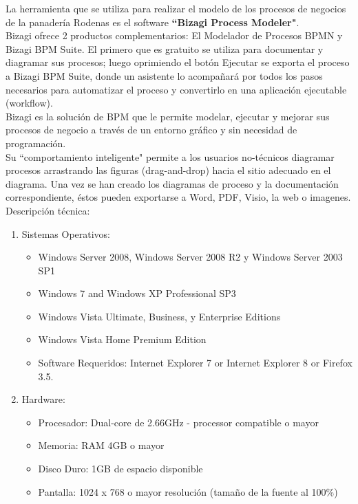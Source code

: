 La herramienta que se utiliza para realizar el modelo de los procesos de negocios de la panadería Rodenas es el software \textbf{``Bizagi Process Modeler"}.
\\

Bizagi ofrece 2 productos complementarios: El Modelador de Procesos BPMN y Bizagi BPM Suite. El primero que es gratuito se utiliza para documentar y diagramar sus procesos; luego oprimiendo el botón Ejecutar se exporta el proceso a Bizagi BPM Suite, donde un asistente lo acompañará por todos los pasos necesarios para automatizar el proceso y convertirlo en una aplicación ejecutable (workflow).
\\
Bizagi es la solución de BPM que le permite modelar, ejecutar y mejorar sus procesos de negocio a través de un entorno gráfico y sin necesidad de programación.
\\
Su ``comportamiento inteligente" permite a los usuarios no-técnicos diagramar procesos arrastrando las figuras (drag-and-drop) hacia el sitio adecuado en el diagrama. Una vez se han creado los diagramas de proceso y la documentación correspondiente, éstos pueden exportarse a Word, PDF, Visio, la web o imagenes.
\\
Descripción técnica:
\begin{enumerate}

\item Sistemas Operativos:
\begin{itemize}
\item Windows Server 2008, Windows Server 2008 R2 y Windows Server 2003 SP1
\item Windows 7 and Windows XP Professional SP3 
\item Windows Vista Ultimate, Business, y Enterprise Editions
\item Windows Vista Home Premium Edition
\\
\item Software Requeridos: Internet Explorer 7 or Internet Explorer 8 or Firefox 3.5.
\end{itemize}

\item Hardware:
\begin{itemize}
\item Procesador: Dual-core de 2.66GHz - processor compatible o mayor
\item Memoria: RAM 4GB o mayor
\item Disco Duro: 1GB de espacio disponible
\item Pantalla: 1024 x 768 o mayor resolución (tamaño de la fuente al 100\%)
\end{itemize}
\end{enumerate}



